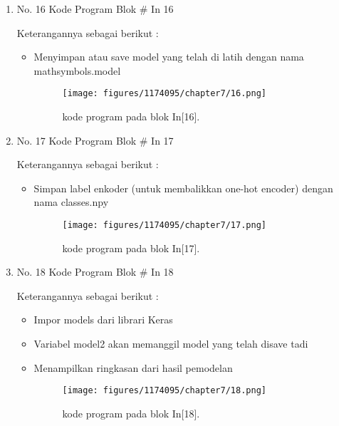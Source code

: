 \begin{enumerate}
\item No. 16 Kode Program Blok \# In 16
\par 
Keterangannya sebagai berikut :
\begin{itemize}
\item Menyimpan atau save model yang telah di latih dengan nama mathsymbols.model 
\begin{figure}[H]
    \texttt{[image: figures/1174095/chapter7/16.png]}
    \centering
    \caption{kode program pada blok  In[16].}
    \end{figure}
\end{itemize}

\item No. 17 Kode Program Blok \# In 17
\par 
Keterangannya sebagai berikut :
\begin{itemize}
\item Simpan label enkoder (untuk membalikkan one-hot encoder) dengan nama classes.npy
\begin{figure}[H]
    \texttt{[image: figures/1174095/chapter7/17.png]}
    \centering
    \caption{kode program pada blok  In[17].}
    \end{figure}
\end{itemize}

\item No. 18 Kode Program Blok \# In 18
\par 
Keterangannya sebagai berikut :
\begin{itemize}
\item Impor models dari librari Keras
\item Variabel model2 akan memanggil model yang telah disave tadi 
\item Menampilkan ringkasan dari hasil pemodelan
\begin{figure}[H]
    \texttt{[image: figures/1174095/chapter7/18.png]}
    \centering
    \caption{kode program pada blok  In[18].}
    \end{figure}
\end{itemize}


\end{enumerate}
